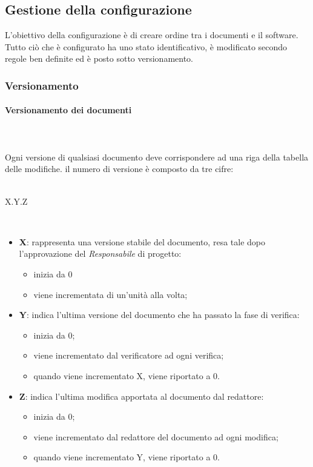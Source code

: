 \subsection{Gestione della configurazione}
L'obiettivo della configurazione è di creare ordine tra i documenti e il software. Tutto ciò che è configurato ha uno stato identificativo, è modificato secondo regole ben definite ed è posto sotto versionamento\glo.

\subsubsection{Versionamento}
\paragraph{Versionamento dei documenti} \mbox{} \\ \mbox{} \\
Ogni versione di qualsiasi documento deve corrispondere ad una riga della tabella delle modifiche. il numero di versione è composto da tre cifre: \\ \\
\centerline{X.Y.Z} \\
\begin{itemize}
\item \textbf{X}: rappresenta una versione stabile del documento, resa tale dopo l'approvazione del \textit{Responsabile} di progetto: \begin{itemize}
\item inizia da 0 
\item viene incrementata di un'unità alla volta;
\end{itemize}
\item \textbf{Y}: indica l'ultima versione del documento che ha passato la fase di verifica: \begin{itemize}
\item inizia da 0;
\item viene incrementato dal verificatore ad ogni verifica;
\item quando viene incrementato X, viene riportato a 0.
\end{itemize} 
\item \textbf{Z}: indica l'ultima modifica apportata al documento dal redattore: \begin{itemize}
\item inizia da 0;
\item viene incrementato dal redattore del documento ad ogni modifica;
\item quando viene incrementato Y, viene riportato a 0.
\end{itemize}
\end{itemize}

